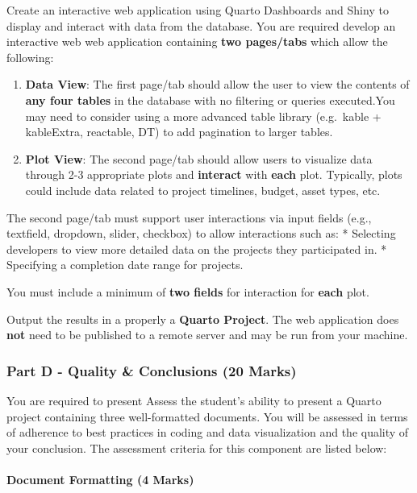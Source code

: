 \documentclass[
  letterpaper,
  DIV=11,
  numbers=noendperiod]{scrartcl}
\let\oldparagraph\paragraph
\renewcommand{\paragraph}[1]{\oldparagraph{#1}\mbox{}}
\providecommand{\tightlist}{%
  \setlength{\itemsep}{0pt}\setlength{\parskip}{0pt}}\usepackage{longtable,booktabs,array}
\begin{document}
Create an interactive web application using Quarto Dashboards and Shiny
to display and interact with data from the database. You are required
develop an interactive web web application containing \textbf{two
pages/tabs} which allow the following:

\begin{enumerate}
\def\labelenumi{\arabic{enumi}.}
\tightlist
\item
  \textbf{Data View}: The first page/tab should allow the user to view
  the contents of \textbf{any four tables} in the database with no
  filtering or queries executed.You may need to consider using a more
  advanced table library (e.g.~kable + kableExtra, reactable, DT) to add
  pagination to larger tables.
\item
  \textbf{Plot View}: The second page/tab should allow users to
  visualize data through 2-3 appropriate plots and \textbf{interact}
  with \textbf{each} plot. Typically, plots could include data related
  to project timelines, budget, asset types, etc.
\end{enumerate}

The second page/tab must support user interactions via input fields
(e.g., textfield, dropdown, slider, checkbox) to allow interactions such
as: * Selecting developers to view more detailed data on the projects
they participated in. * Specifying a completion date range for projects.

You must include a minimum of \textbf{two fields} for interaction for
\textbf{each} plot.

Output the results in a properly a \textbf{Quarto Project}. The web
application does \textbf{not} need to be published to a remote server
and may be run from your machine.

\hypertarget{part-d---quality-conclusions-20-marks}{%
\subsubsection{Part D - Quality \& Conclusions (20
Marks)}\label{part-d---quality-conclusions-20-marks}}

You are required to present Assess the student's ability to present a
Quarto project containing three well-formatted documents. You will be
assessed in terms of adherence to best practices in coding and data
visualization and the quality of your conclusion. The assessment
criteria for this component are listed below:

\hypertarget{document-formatting-4-marks}{%
\paragraph{Document Formatting (4
Marks)}\label{document-formatting-4-marks}}
\end{document}
